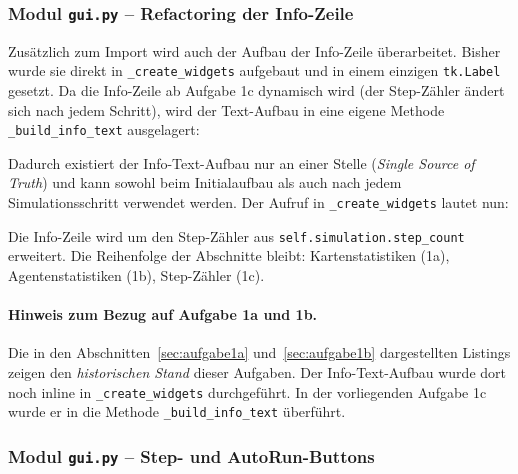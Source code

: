
\subsubsection{Modul \texttt{gui.py} – Refactoring der Info-Zeile}
\label{sssec:refactoring_info_1c}

Zusätzlich zum Import wird auch der Aufbau der Info-Zeile überarbeitet. Bisher wurde sie direkt in \texttt{\_create\_widgets} aufgebaut und in einem einzigen \texttt{tk.Label} gesetzt. Da die Info-Zeile ab Aufgabe 1c dynamisch wird (der Step-Zähler ändert sich nach jedem Schritt), wird der Text-Aufbau in eine eigene Methode \texttt{\_build\_info\_text} ausgelagert:



Dadurch existiert der Info-Text-Aufbau nur an einer Stelle (\textit{Single Source of Truth}) und kann sowohl beim Initialaufbau als auch nach jedem Simulationsschritt verwendet werden. Der Aufruf in \texttt{\_create\_widgets} lautet nun:



Die Info-Zeile wird um den Step-Zähler aus \texttt{self.simulation.step\_count} erweitert. Die Reihenfolge der Abschnitte bleibt: Kartenstatistiken (1a), Agentenstatistiken (1b), Step-Zähler (1c).

\paragraph{Hinweis zum Bezug auf Aufgabe 1a und 1b.}
Die in den Abschnitten~\ref{sec:aufgabe1a} und~\ref{sec:aufgabe1b} dargestellten Listings zeigen den \textit{historischen Stand} dieser Aufgaben. Der Info-Text-Aufbau wurde dort noch inline in \texttt{\_create\_widgets} durchgeführt. In der vorliegenden Aufgabe 1c wurde er in die Methode \texttt{\_build\_info\_text} überführt.


\subsubsection{Modul \texttt{gui.py} – Step- und AutoRun-Buttons}

